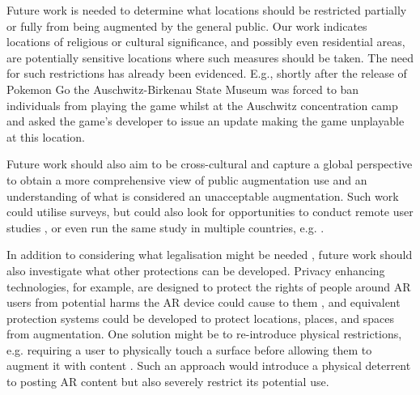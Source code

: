 Future work is needed to determine what locations should be restricted partially or fully from being augmented by the general public. 
Our work indicates locations of religious or cultural significance, and possibly even residential areas, are potentially sensitive locations where such measures should be taken. 
The need for such restrictions has already been evidenced.
E.g., shortly after the release of Pokemon Go the Auschwitz-Birkenau State Museum was forced to ban individuals from playing the game whilst at the Auschwitz concentration camp \cite{pokemon-go} and asked the game's developer to issue an update making the game unplayable at this location. 

Future work should also aim to be cross-cultural and capture a global perspective to obtain a more comprehensive view of public augmentation use and an understanding of what is considered an unacceptable augmentation. 
Such work could utilise surveys, but could also look for opportunities to conduct remote user studies \cite{flo-alt-methods, flo-alt-methods-2, flo-alt-methods-3}, or even run the same study in multiple countries, e.g. \cite{ammar}.

In addition to considering what legalisation might be needed \cite{mum-essay, essay-short}, future work should also investigate what other protections can be developed.
Privacy enhancing technologies, for example, are designed to protect the rights of people around AR users from potential harms the AR device could cause to them \cite{imwut-joseph}, and equivalent protection systems could be developed to protect locations, places, and spaces from augmentation. 
One solution might be to re-introduce physical restrictions, e.g. requiring a user to physically touch a surface before allowing them to augment it with content \cite{sphere, van2004tangible, billinghurst2008tangible}. 
Such an approach would introduce a physical deterrent to posting AR content but also severely restrict its potential use. 

